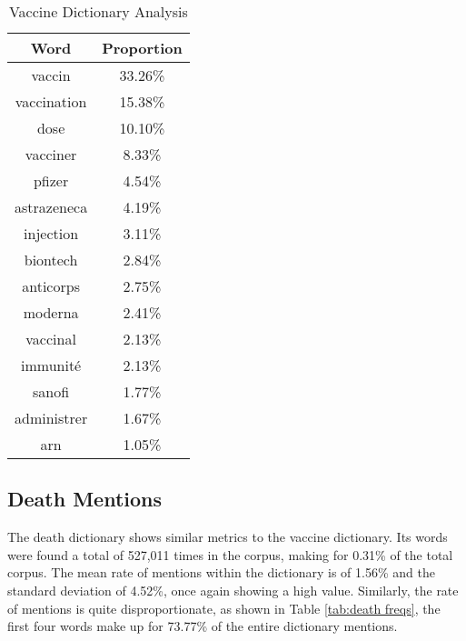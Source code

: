 \begin{table}[H]
\caption{Vaccine Dictionary Analysis}
\label{tab:vaccine freqs}
\centering
\begin{tabular}{@{}cc@{}}
\toprule
Word      & Proportion \\ \midrule
vaccin      & 33.26\% \\
vaccination & 15.38\% \\
dose        & 10.10\% \\
vacciner    & 8.33\%  \\
pfizer      & 4.54\%  \\
astrazeneca & 4.19\%  \\
injection   & 3.11\%  \\
biontech    & 2.84\%  \\
anticorps   & 2.75\%  \\
moderna     & 2.41\%  \\
vaccinal    & 2.13\%  \\
immunité    & 2.13\%  \\
sanofi      & 1.77\%  \\
administrer & 1.67\%  \\
arn         & 1.05\%  \\ \bottomrule
\end{tabular}
\end{table}

\subsection{Death Mentions}

The death dictionary shows similar metrics to the vaccine dictionary. Its words were found a total of 527,011 times in the corpus, making for 0.31\% of the total corpus. The mean rate of mentions within the dictionary is of 1.56\% and the standard deviation of 4.52\%, once again showing a high value. Similarly, the rate of mentions is quite disproportionate, as shown in Table \ref{tab:death freqs}, the first four words make up for 73.77\% of the entire dictionary mentions.

